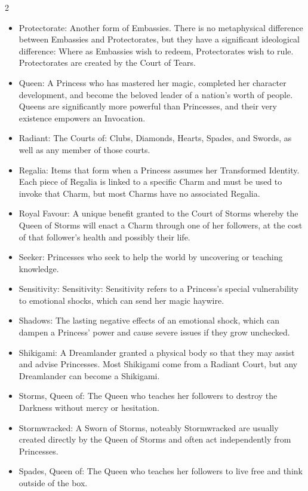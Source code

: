 \begin{multicols}{2}
\begin{itemize}
  \item Protectorate: Another form of Embassies. There is no metaphysical difference between Embassies and Protectorates, but they have a significant ideological difference: Where as Embassies wish to redeem, Protectorates wish to rule. Protectorates are created by the Court of Tears. 
  \item Queen: A Princess who has mastered her magic, completed her character development, and become the beloved leader of a nation's worth of people. Queens are significantly more powerful than Princesses, and their very existence empowers an Invocation. 
  \item Radiant: The Courts of: Clubs, Diamonds, Hearts, Spades, and Swords, as well as any member of those courts.
  \item Regalia: Items that form when a Princess assumes her Transformed Identity. Each piece of Regalia is linked to a specific Charm and must be used to invoke that Charm, but most Charms have no associated Regalia. 
  \item Royal Favour: A unique benefit granted to the Court of Storms whereby the Queen of Storms will enact a Charm through one of her followers, at the cost of that follower's health and possibly their life. 
  \item Seeker: Princesses who seek to help the world by uncovering or teaching knowledge. 
  \item Sensitivity: Sensitivity: Sensitivity refers to a Princess's special vulnerability to emotional shocks, which can send her magic haywire.
  \item Shadows: The lasting negative effects of an emotional shock, which can dampen a Princess' power and cause severe issues if they grow unchecked. 
  \item Shikigami: A Dreamlander granted a physical body so that they may assist and advise Princesses. Most Shikigami come from a Radiant Court, but any Dreamlander can become a Shikigami. 
  \item Storms, Queen of: The Queen who teaches her followers to destroy the Darkness without mercy or hesitation.
  \item Stormwracked: A Sworn of Storms, noteably Stormwracked are usually created directly by the Queen of Storms and often act independently from Princesses. 
  \item Spades, Queen of: The Queen who teaches her followers to live free and think outside of the box. 

\end{itemize}
\end{multicols}

